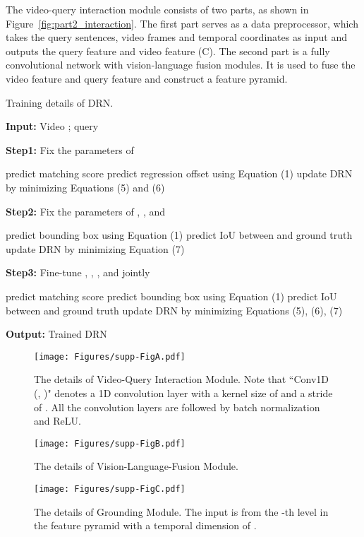 \documentclass[10pt,twocolumn,letterpaper]{article}
\begin{document}
The video-query interaction module consists of two parts, as shown in Figure~\ref{fig:part2_interaction}. The first part serves as a data preprocessor, which takes the query sentences, video frames and temporal coordinates as input and outputs the query feature and video feature ({C}). The second part is a fully convolutional network with vision-language fusion modules. It is 
used to fuse the video feature and query feature and construct a feature pyramid.
\begin{algorithm}[!t]
	\caption{Training details of DRN.}
\textbf{Input:} Video ; query 
	
	\textbf{Step1:} Fix the parameters of  
	\begin{algorithmic}[1]
		\State predict matching score 
		\State predict regression offset  using Equation (1)
		\State update DRN by minimizing Equations (5) and (6)
		\EndWhile
	\end{algorithmic} 
	
	\textbf{Step2:} Fix the parameters of , , and  
	\begin{algorithmic}[1]
		\State predict bounding box  using Equation (1)
		\State predict IoU between  and ground truth
		\State update DRN by minimizing Equation (7)
		\EndWhile
	\end{algorithmic} 
	
	\textbf{Step3:} Fine-tune , , , and  jointly 
	\begin{algorithmic}[1]
		\State predict matching score 
		\State predict bounding box  using Equation (1)
		\State predict IoU between  and ground truth
		\State update DRN by minimizing Equations (5), (6), (7)
		\EndWhile
	\end{algorithmic}
	\textbf{Output:} Trained DRN
	
	\label{alg:train}
\end{algorithm}
\vspace{-0.1in}

\begin{figure*}[!t]
	\centering
\texttt{[image: Figures/supp-FigA.pdf]}
	\caption{The details of Video-Query Interaction Module. Note that ``Conv1D (, )" denotes a 1D convolution layer with a kernel size of  and a stride of . All the convolution layers are followed by batch normalization and ReLU.}
	\label{fig:part2_interaction}


	
\centering
	\texttt{[image: Figures/supp-FigB.pdf]}
	\caption{The details of Vision-Language-Fusion Module.}
	\label{fig:vision_language_fusion}
\centering
	\texttt{[image: Figures/supp-FigC.pdf]}
	
	\caption{The details of  Grounding Module. The input  is from the -th level in the feature pyramid with a temporal dimension of .}
	\label{fig:ground_module}
\end{figure*}
\end{document}

